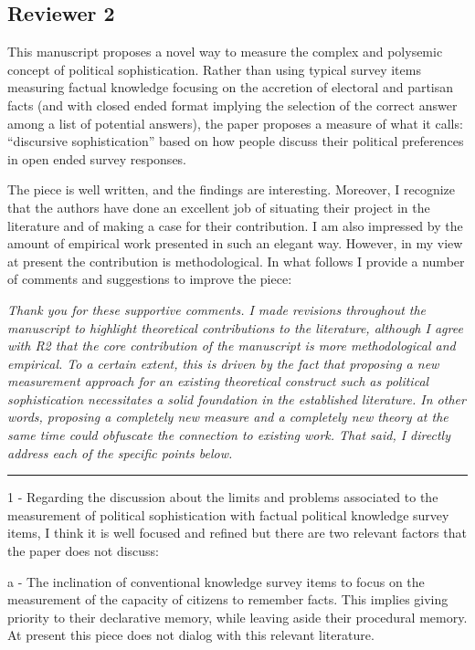 

\subsection*{Reviewer 2}

This manuscript proposes a novel way to measure the complex and polysemic concept of political sophistication. Rather than using typical survey items measuring factual knowledge focusing on the accretion of electoral and partisan facts (and with closed ended format implying the selection of the correct answer among a list of potential answers), the paper proposes a measure of what it calls: ``discursive sophistication'' based on how people discuss their political preferences in open ended survey responses. 

The piece is well written, and the findings are interesting. Moreover, I recognize that the authors have done an excellent job of situating their project in the literature and of making a case for their contribution. I am also impressed by the amount of empirical work presented in such an elegant way. However, in my view at present the contribution is methodological. In what follows I provide a number of comments and suggestions to improve the piece:

\textit{Thank you for these supportive comments. I made revisions throughout the manuscript to highlight theoretical contributions to the literature, although I agree with R2 that the core contribution of the manuscript is more methodological and empirical. To a certain extent, this is driven by the fact that proposing a new measurement approach for an existing theoretical construct such as political sophistication necessitates a solid foundation in the established literature. In other words, proposing a completely new measure {\normalfont and} a completely new theory at the same time could obfuscate the connection to existing work. That said, I directly address each of the specific points below.}


\rule{\linewidth}{.01cm}

1 - Regarding the discussion about the limits and problems associated to the measurement of political sophistication with factual political knowledge survey items, I think it is well focused and refined but there are two relevant factors that the paper does not discuss: 

a - The inclination of conventional knowledge survey items to focus on the measurement of the capacity of citizens to remember facts. This implies giving priority to their declarative memory, while leaving aside their procedural memory. At present this piece does not dialog with this relevant literature.

